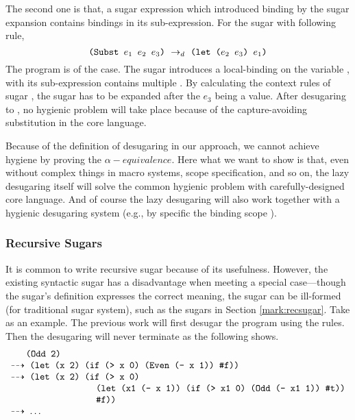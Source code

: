 The second one is that, a sugar expression which introduced binding by the sugar expansion contains bindings in its sub-expression. For the sugar  with following rule,
\[
\texttt{(Subst $e_1$ $e_2$ $e_3$)} ~\rightarrow_d~ \texttt{(let ($e_2$ $e_3$) $e_1$)}
\]
The program  is of the case. The sugar introduces a local-binding on the variable , with its sub-expression contains multiple . By calculating the context rules of sugar , the sugar has to be expanded after the $e_3$ being a value. After desugaring to ,  no hygienic problem will take place because of the capture-avoiding substitution in the core language.

Because of the definition of desugaring in our approach, we cannot achieve hygiene by proving the $\alpha-equivalence$.
Here what we want to show is that, even without complex things in macro systems, scope specification, and so on, the lazy desugaring itself will solve the common hygienic problem with carefully-designed core language. And of course the lazy desugaring will also work together with a hygienic desugaring system (e.g., by specific the binding scope \cite{10.5555/1792878.1792884}).

\subsubsection{Recursive Sugars}
\label{sec:recursiveSugar}

It is common to write recursive sugar because of its usefulness. However, the existing syntactic sugar has a disadvantage when meeting a special case---though the sugar's definition expresses the correct meaning, the sugar can be ill-formed (for traditional sugar system), such as the  sugars in Section \ref{mark:recsugar}. Take  as an example. The previous work will first desugar the program using the rules. Then the desugaring will never terminate as the following shows.
\[
	\begin{array}{l}
		\quad\;\ \Code{(Odd 2)}\\
		\DeStep{\Code{ (let (x 2) (if (> x 0) (Even (- x 1)) \false))}}\\
		\DeStep{\Code{ (let (x 2) (if (> x 0)}}\\
		\qquad\qquad\qquad\qquad\quad \Code{(let (x1 (- x 1)) (if (> x1 0) (Odd (- x1 1)) \#t))}\\
		\qquad\qquad\qquad\qquad\quad \Code{\false))}\\
		\DeStep{\Code{ $\ldots$}}
	\end{array}
\]



